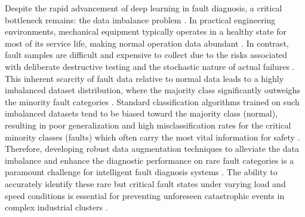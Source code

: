 Despite the rapid advancement of deep learning in fault diagnosis, a critical bottleneck remains: the data imbalance problem \cite{fan2021enhanced_gan, liu2024gan_imbalanced_review, qiao2021imbalanced_bearing}. In practical engineering environments, mechanical equipment typically operates in a healthy state for most of its service life, making normal operation data abundant \cite{qiao2021imbalanced_bearing, liu2024gan_imbalanced_review}. In contrast, fault samples are difficult and expensive to collect due to the risks associated with deliberate destructive testing and the stochastic nature of actual failures \cite{liu2020gan_smote_fault, zhao2022cnn_smote_bearing}. This inherent scarcity of fault data relative to normal data leads to a highly imbalanced dataset distribution, where the majority class significantly outweighs the minority fault categories \cite{zhao2022cnn_smote_bearing, li2021wgan_gp_fault, qiao2021imbalanced_bearing}. Standard classification algorithms trained on such imbalanced datasets tend to be biased toward the majority class (normal), resulting in poor generalization and high misclassification rates for the critical minority classes (faults) which often carry the most vital information for safety \cite{qiao2021imbalanced_bearing, fan2021enhanced_gan, liu2024gan_imbalanced_review}. Therefore, developing robust data augmentation techniques to alleviate the data imbalance and enhance the diagnostic performance on rare fault categories is a paramount challenge for intelligent fault diagnosis systems \cite{liu2024gan_imbalanced_review, han2020wgangp_bearing, li2021wgan_gp_fault}. The ability to accurately identify these rare but critical fault states under varying load and speed conditions is essential for preventing unforeseen catastrophic events in complex industrial clusters \cite{qiao2021imbalanced_bearing, han2020wgangp_bearing}.

